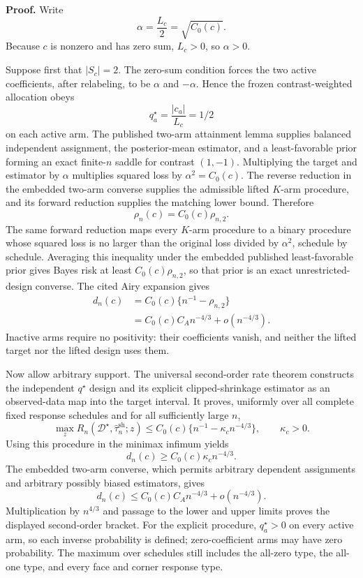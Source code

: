 \textbf{Proof.}
Write
\[
 \alpha=\frac{L_c}{2}=\sqrt{C_0(c)}.
\]
Because \(c\) is nonzero and has zero sum, \(L_c>0\), so \(\alpha>0\).

Suppose first that \(|S_c|=2\).  The zero-sum condition forces the two active coefficients, after relabeling, to be \(\alpha\) and \(-\alpha\).  Hence the frozen contrast-weighted allocation obeys
\[
 q_a^\star=\frac{|c_a|}{L_c}=1/2
\]
on each active arm.  The published two-arm attainment lemma supplies balanced independent assignment, the posterior-mean estimator, and a least-favorable prior forming an exact finite-\(n\) saddle for contrast \((1,-1)\).  Multiplying the target and estimator by \(\alpha\) multiplies squared loss by \(\alpha^2=C_0(c)\).  The reverse reduction in the embedded two-arm converse supplies the admissible lifted \(K\)-arm procedure, and its forward reduction supplies the matching lower bound.  Therefore
\[
 \rho_n(c)=C_0(c)\rho_{n,2}.
\]
The same forward reduction maps every \(K\)-arm procedure to a binary procedure whose squared loss is no larger than the original loss divided by \(\alpha^2\), schedule by schedule.  Averaging this inequality under the embedded published least-favorable prior gives Bayes risk at least \(C_0(c)\rho_{n,2}\), so that prior is an exact unrestricted-design converse.  The cited Airy expansion gives
\[
 \begin{aligned}
 d_n(c)
 &=C_0(c)\{n^{-1}-\rho_{n,2}\}\\
 &=C_0(c)C_A n^{-4/3}+o(n^{-4/3}).
 \end{aligned}
\]
Inactive arms require no positivity: their coefficients vanish, and neither the lifted target nor the lifted design uses them.

Now allow arbitrary support.  The universal second-order rate theorem constructs the independent \(q^\star\) design and its explicit clipped-shrinkage estimator as an observed-data map into the target interval.  It proves, uniformly over all complete fixed response schedules and for all sufficiently large \(n\),
\[
 \max_zR_n(\mathcal D^\star,\widehat\tau_n^{\mathrm{sh}};z)
 \leq C_0(c)\{n^{-1}-\kappa_cn^{-4/3}\},
 \qquad \kappa_c>0.
\]
Using this procedure in the minimax infimum yields
\[
 d_n(c)\geq C_0(c)\kappa_cn^{-4/3}.
\]
The embedded two-arm converse, which permits arbitrary dependent assignments and arbitrary possibly biased estimators, gives
\[
 d_n(c)\leq C_0(c)C_A n^{-4/3}+o(n^{-4/3}).
\]
Multiplication by \(n^{4/3}\) and passage to the lower and upper limits proves the displayed second-order bracket.  For the explicit procedure, \(q_a^\star>0\) on every active arm, so each inverse probability is defined; zero-coefficient arms may have zero probability.  The maximum over schedules still includes the all-zero type, the all-one type, and every face and corner response type.

